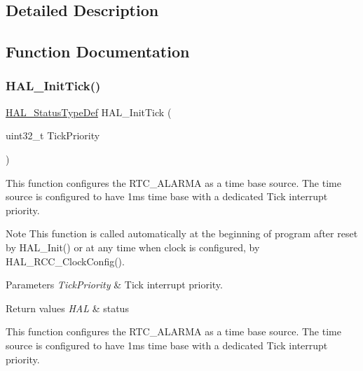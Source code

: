 \subsection{Detailed Description}


\subsection{Function Documentation}
\mbox{\label{group___h_a_l___exported___functions___group1_ga879cdb21ef051eb81ec51c18147397d5}} 
\subsubsection{\texorpdfstring{H\+A\+L\+\_\+\+Init\+Tick()}{HAL\_InitTick()}}
{\footnotesize\ttfamily \hyperlink{stm32f0xx__hal__def_8h_a63c0679d1cb8b8c684fbb0632743478f}{H\+A\+L\+\_\+\+Status\+Type\+Def} H\+A\+L\+\_\+\+Init\+Tick (\begin{DoxyParamCaption}\item[{uint32\+\_\+t}]{Tick\+Priority }\end{DoxyParamCaption})}



This function configures the R\+T\+C\+\_\+\+A\+L\+A\+R\+MA as a time base source. The time source is configured to have 1ms time base with a dedicated Tick interrupt priority. 

\begin{DoxyNote}{Note}
This function is called automatically at the beginning of program after reset by H\+A\+L\+\_\+\+Init() or at any time when clock is configured, by H\+A\+L\+\_\+\+R\+C\+C\+\_\+\+Clock\+Config(). 
\end{DoxyNote}

\begin{DoxyParams}{Parameters}
{\em Tick\+Priority} & Tick interrupt priority. \\
\hline
\end{DoxyParams}

\begin{DoxyRetVals}{Return values}
{\em H\+AL} & status\\
\hline
\end{DoxyRetVals}
This function configures the R\+T\+C\+\_\+\+A\+L\+A\+R\+MA as a time base source. The time source is configured to have 1ms time base with a dedicated Tick interrupt priority.

